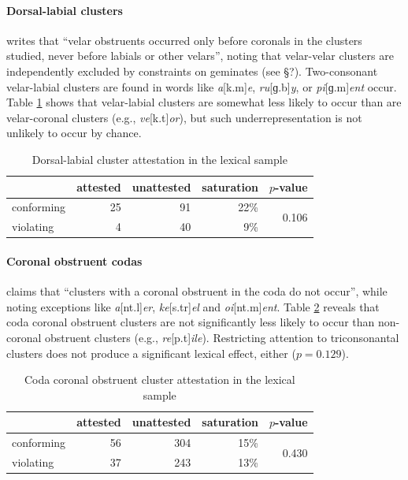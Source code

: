 \paragraph{Dorsal-labial clusters} \citet[173]{Pierrehumbert1994} writes that ``velar obstruents occurred only before coronals in the clusters studied, never before labials or other velars'', noting that velar-velar clusters are independently excluded by constraints on geminates (see \S?). Two-consonant velar-labial clusters are found in words like \emph{a}[k.m]\emph{e}, \emph{ru}[ɡ.b]\emph{y}, or \emph{pi}[ɡ.m]\emph{ent} occur. Table \ref{dltab} shows that velar-labial clusters are somewhat less likely to occur than  are velar-coronal clusters (e.g., \emph{ve}[k.t]\emph{or}), but such underrepresentation is not unlikely to occur by chance.

\begin{table}
\centering
\begin{tabular}{l rrrr}
\toprule
           & attested & unattested & saturation & $p$-value \\
\midrule
conforming & 25       & 91         & 22\%       & \multirow{2}{*}{0.106} \\
violating  &  4       & 40         &  9\%       \\
\bottomrule
\end{tabular}
\caption{Dorsal-labial cluster attestation in the lexical sample}
\label{dltab}
\end{table}

\paragraph{Coronal obstruent codas} \citet[175]{Pierrehumbert1994} claims that ``clusters with a coronal obstruent in the coda do not occur'', while noting exceptions like \emph{a}[nt.l]\emph{er}, \emph{ke}[s.tr]\emph{el} and \emph{oi}[nt.m]\emph{ent}. Table \ref{cctab} reveals that coda coronal obstruent clusters are not significantly less likely to occur than non-coronal obstruent clusters (e.g., \emph{re}[p.t]\emph{ile}). Restricting attention to triconsonantal clusters does not produce a significant lexical effect, either ($p = 0.129$).

\begin{table}
\centering
\begin{tabular}{l rrrr}
\toprule
           & attested & unattested & saturation & $p$-value \\
\midrule
conforming & 56       & 304        & 15\%       & \multirow{2}{*}{0.430} \\
violating  & 37       & 243        & 13\%       \\
\bottomrule
\end{tabular}
\caption{Coda coronal obstruent cluster attestation in the lexical sample}
\label{cctab}
\end{table}

